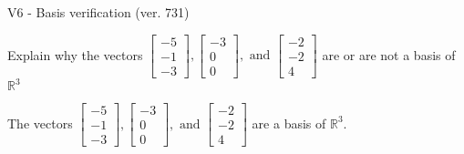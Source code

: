 \begin{exercise}
  \begin{exerciseTitle}V6 - Basis verification (ver. 731)\end{exerciseTitle}
  \begin{exerciseStatement}
    Explain why the vectors \(\left[\begin{array}{r}
-5 \\
-1 \\
-3
\end{array}\right] , \left[\begin{array}{r}
-3 \\
0 \\
0
\end{array}\right] , \text{ and } \left[\begin{array}{r}
-2 \\
-2 \\
4
\end{array}\right]\) are or are not a basis of \(\mathbb{R}^3\)	


  \end{exerciseStatement}
  \begin{exerciseAnswer}
   The vectors \(\left[\begin{array}{r}
-5 \\
-1 \\
-3
\end{array}\right] , \left[\begin{array}{r}
-3 \\
0 \\
0
\end{array}\right] , \text{ and } \left[\begin{array}{r}
-2 \\
-2 \\
4
\end{array}\right]\) 
  	 are  a basis of \(\mathbb{R}^3\).
  


  \end{exerciseAnswer}
\end{exercise}